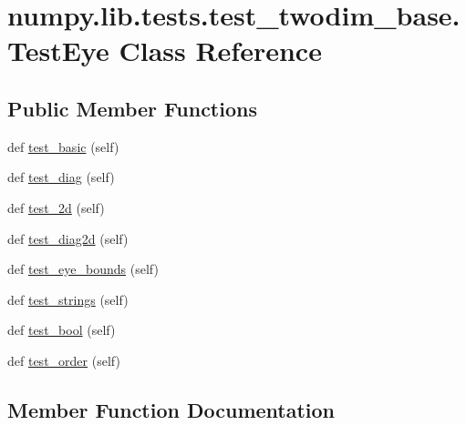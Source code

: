 \hypertarget{classnumpy_1_1lib_1_1tests_1_1test__twodim__base_1_1TestEye}{}\section{numpy.\+lib.\+tests.\+test\+\_\+twodim\+\_\+base.\+Test\+Eye Class Reference}
\label{classnumpy_1_1lib_1_1tests_1_1test__twodim__base_1_1TestEye}
\subsection*{Public Member Functions}
\begin{DoxyCompactItemize}
\item 
def \hyperlink{classnumpy_1_1lib_1_1tests_1_1test__twodim__base_1_1TestEye_ab34ea475bfcfacc0020cefe60089be5a}{test\+\_\+basic} (self)
\item 
def \hyperlink{classnumpy_1_1lib_1_1tests_1_1test__twodim__base_1_1TestEye_abc2e4d6b30b343e72dd2e94ec2ab5b49}{test\+\_\+diag} (self)
\item 
def \hyperlink{classnumpy_1_1lib_1_1tests_1_1test__twodim__base_1_1TestEye_a864fa3d4701b808d287844307c7cfb28}{test\+\_\+2d} (self)
\item 
def \hyperlink{classnumpy_1_1lib_1_1tests_1_1test__twodim__base_1_1TestEye_a0c8b81b8afe6badb26d7a5259f9e15b9}{test\+\_\+diag2d} (self)
\item 
def \hyperlink{classnumpy_1_1lib_1_1tests_1_1test__twodim__base_1_1TestEye_a1ce6765da48070a8d859a68348d479e1}{test\+\_\+eye\+\_\+bounds} (self)
\item 
def \hyperlink{classnumpy_1_1lib_1_1tests_1_1test__twodim__base_1_1TestEye_a7b3454f0dbae8c4091cf7be43c75c605}{test\+\_\+strings} (self)
\item 
def \hyperlink{classnumpy_1_1lib_1_1tests_1_1test__twodim__base_1_1TestEye_a4e9d9d9fd7a5cb129ae08806e8804043}{test\+\_\+bool} (self)
\item 
def \hyperlink{classnumpy_1_1lib_1_1tests_1_1test__twodim__base_1_1TestEye_a755e2268bff95f2bb53c56a86b158cde}{test\+\_\+order} (self)
\end{DoxyCompactItemize}


\subsection{Member Function Documentation}
\mbox{\label{classnumpy_1_1lib_1_1tests_1_1test__twodim__base_1_1TestEye_a864fa3d4701b808d287844307c7cfb28}} 
